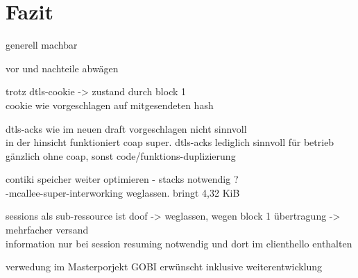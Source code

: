 \chapter{Fazit}
\label{chp:fazit}

generell machbar

vor und nachteile abwägen

trotz dtls-cookie -> zustand durch block 1\\
cookie wie vorgeschlagen auf mitgesendeten hash

dtls-acks wie im neuen draft \cite{draftpractical} vorgeschlagen nicht sinnvoll\\
in der hinsicht funktioniert coap super. dtls-acks lediglich sinnvoll für betrieb gänzlich ohne coap, sonst code/funktions-duplizierung

contiki speicher weiter optimieren - stacks notwendig ?\\
-mcallee-super-interworking weglassen. bringt 4,32 KiB

sessions als sub-ressource ist doof -> weglassen, wegen block 1 übertragung -> mehrfacher versand\\
information nur bei session resuming notwendig und dort im clienthello enthalten

verwedung im Masterporjekt GOBI erwünscht inklusive weiterentwicklung